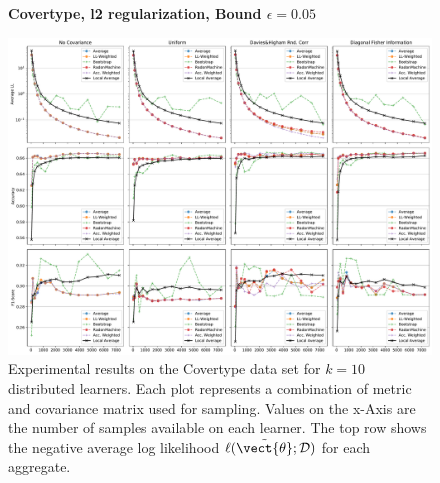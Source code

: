     \begin{landscape}
    \begin{figure}
        \centering
        \textbf{Covertype, l2 regularization, Bound $\epsilon=0.05$}\par\medskip
        \includegraphics[height=\dimexpr \textheight - 1\baselineskip\relax]{kapitel/figures/covertype_l2_0.05.pdf}
        \caption[Covertype plots with l2 regularization and $\epsilon=0.05$]{Experimental results on the Covertype data set for $k=10$ distributed learners. Each plot represents a combination of metric and covariance matrix used for sampling. Values on the x-Axis are the number of samples available on each learner. The top row shows the negative average log likelihood $\ell(\tilde{\vect{\theta}}; \mathcal{D})$ for each aggregate.}
        \label{fig:analysis2}
    \end{figure}
    \end{landscape}
